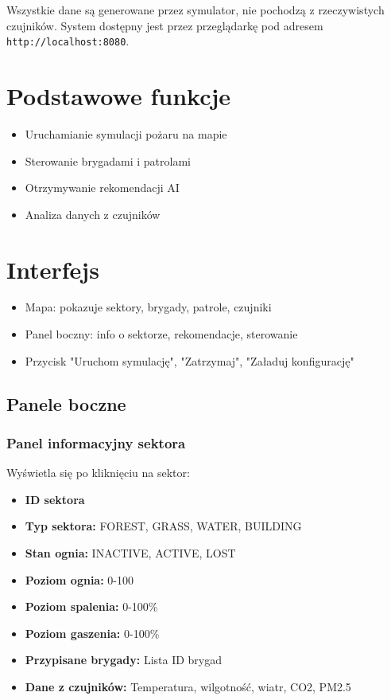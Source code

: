 Wszystkie dane są generowane przez symulator, nie pochodzą z rzeczywistych czujników. System dostępny jest przez przeglądarkę pod adresem \texttt{http://localhost:8080}.

\section{Podstawowe funkcje}

\begin{itemize}
    \item Uruchamianie symulacji pożaru na mapie
    \item Sterowanie brygadami i patrolami
    \item Otrzymywanie rekomendacji AI
    \item Analiza danych z czujników
\end{itemize}

\section{Interfejs}

\begin{itemize}
    \item Mapa: pokazuje sektory, brygady, patrole, czujniki
    \item Panel boczny: info o sektorze, rekomendacje, sterowanie
    \item Przycisk "Uruchom symulację", "Zatrzymaj", "Załaduj konfigurację"
\end{itemize}

\subsection{Panele boczne}

\subsubsection{Panel informacyjny sektora}

Wyświetla się po kliknięciu na sektor:

\begin{itemize}
    \item \textbf{ID sektora}
    \item \textbf{Typ sektora:} FOREST, GRASS, WATER, BUILDING
    \item \textbf{Stan ognia:} INACTIVE, ACTIVE, LOST
    \item \textbf{Poziom ognia:} 0-100
    \item \textbf{Poziom spalenia:} 0-100\%
    \item \textbf{Poziom gaszenia:} 0-100\%
    \item \textbf{Przypisane brygady:} Lista ID brygad
    \item \textbf{Dane z czujników:} Temperatura, wilgotność, wiatr, CO2, PM2.5
\end{itemize}

